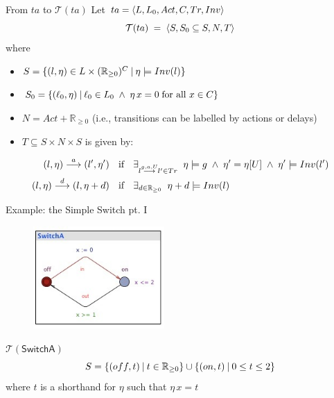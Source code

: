 \documentclass{beamer}
\def\TL#1{\mathcal{T}(#1)}
\begin{document}
\begin{slide}{From $ta$ to $\TL{ta}$}
\small
Let $ta = \mathopen{\langle}L, L_0, Act, C, Tr, Inv\mathclose{\rangle}$
\begin{equation*}
 \TL{ta}\; =\; \pair{S, S_0 \subseteq S, N, T}
\end{equation*}
where
\begin{itemize}
\item
  $S = \mathopen{\{} (l,\eta) \in L \times
    (\mathbb{R}_{\geq 0})^C \mathbin{|} \eta \models Inv(l) \mathclose{\}}$
\item
  $S_0 = \mathopen{\{} (\ell_0,\eta) \mathbin{|} \ell_0 \in L_0\; \mathbin{\wedge}\;
    \eta\, x = 0\; \text{for all $x \in C$} \mathclose{\}}$
\item $N = Act + \mathbb{R}_{\geq 0}$ (i.e., transitions can be
    labelled by actions or delays)
\item $T \subseteq S \times N \times S$ is given by:
\end{itemize}
\begin{align*}
(l,\eta) \stackrel{a}{\longrightarrow} (l',\eta')\; & ~~\text{if}~~\; 
\exists_{l \stackrel{g,a,U}{\longrightarrow} l' \in Tr}  \; \; \eta \models g \; \mathbin{\wedge}\; \eta' = \eta[U] \; \mathbin{\wedge}\; \eta' \models Inv(l')\\
(l,\eta) \stackrel{d}{\longrightarrow} (l,\eta +d)\; & ~~\text{if}~~\; 
\exists_{d \in \mathbb{R}_{\geq 0}}  \; \;  \eta + d \models Inv(l)
\end{align*}
\end{slide}
\begin{slide}{Example: the Simple Switch pt. I}
\small
\begin{figure}[htb]
  \centering
  \includegraphics[width=5cm]{./images/PASswitchA.jpg}\\
\end{figure}

\begin{block}{$\TL{\mathsf{SwitchA}}$}
\begin{equation*}
S = \mathopen{\{} (off,t) \mathbin{|} t \in \mathbb{R}_{\geq 0} \mathclose{\}} \cup \mathopen{\{} (on,t) \mathbin{|} 0 \leq t \leq 2 \mathclose{\}} 
\end{equation*}
where $t$ is a shorthand for $\eta$ such that $\eta\, x = t$
\end{block}
\end{slide}
\end{document}
